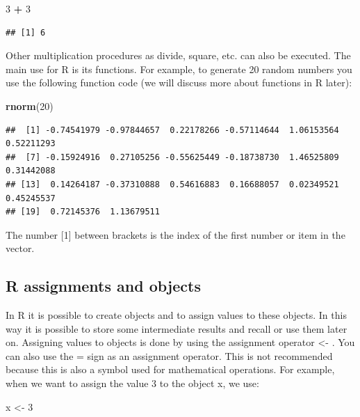 \documentclass[
]{book}
\newenvironment{Shaded}{\begin{snugshade}}{\end{snugshade}}
\newcommand{\DecValTok}[1]{\textcolor[rgb]{0.00,0.00,0.81}{#1}}
\newcommand{\KeywordTok}[1]{\textcolor[rgb]{0.13,0.29,0.53}{\textbf{#1}}}
\newcommand{\NormalTok}[1]{#1}
\newcommand{\OperatorTok}[1]{\textcolor[rgb]{0.81,0.36,0.00}{\textbf{#1}}}
\newcommand{\StringTok}[1]{\textcolor[rgb]{0.31,0.60,0.02}{#1}}
\begin{document}
\begin{Shaded}
\begin{Highlighting}[]
\DecValTok{3} \OperatorTok{+}\StringTok{ }\DecValTok{3}
\end{Highlighting}
\end{Shaded}

\begin{verbatim}
## [1] 6
\end{verbatim}

Other multiplication procedures as divide, square, etc. can also be
executed. The main use for R is its functions. For example, to generate
20 random numbers you use the following function code (we will discuss
more about functions in R later):

\begin{Shaded}
\begin{Highlighting}[]
\KeywordTok{rnorm}\NormalTok{(}\DecValTok{20}\NormalTok{)}
\end{Highlighting}
\end{Shaded}

\begin{verbatim}
##  [1] -0.74541979 -0.97844657  0.22178266 -0.57114644  1.06153564  0.52211293
##  [7] -0.15924916  0.27105256 -0.55625449 -0.18738730  1.46525809  0.31442088
## [13]  0.14264187 -0.37310888  0.54616883  0.16688057  0.02349521  0.45245537
## [19]  0.72145376  1.13679511
\end{verbatim}

The number {[}1{]} between brackets is the index of the first number or
item in the vector.

\hypertarget{r-assignments-and-objects}{%
\subsection{R assignments and objects}\label{r-assignments-and-objects}}

In R it is possible to create objects and to assign values to these
objects. In this way it is possible to store some intermediate results
and recall or use them later on. Assigning values to objects is done by
using the assignment operator \textless- . You can also use the = sign
as an assignment operator. This is not recommended because this is also
a symbol used for mathematical operations. For example, when we want to
assign the value 3 to the object x, we use:

\begin{Shaded}
\begin{Highlighting}[]
\NormalTok{x <-}\StringTok{ }\DecValTok{3} 
\end{Highlighting}
\end{Shaded}
\end{document}
